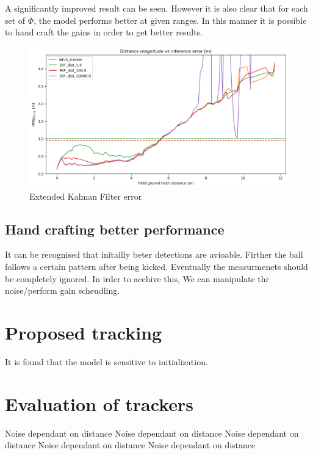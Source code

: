 \documentclass[a4paper,twoside,12pt]{report}
\begin{document}
A significantly improved result can be seen. However it is also clear that for each set of $\Phi$, the model performs better at given ranges. In this manner it is possible to hand craft the gains in order to get better results. 

\begin{figure}[h!]
\begin{center}
\includegraphics[width=13cm]{images/ekf_error.png}
\caption{Extended Kalman Filter error}
\label{fig:ekferror}
\end{center}
\end{figure}

\subsection{Hand crafting better performance}

It can be recognised that initailly beter detections are avioable. Firther the ball follows a certain pattern after being kicked. Eventually the measurmenets should be completely ignored. In irder to acehive this, We can manipulate thr noise/perform gain scheudling. 


\section{Proposed tracking}

It is found that the model is sensitive to initialization. 

\section{Evaluation of trackers}

Noise dependant on distance
Noise dependant on distance
Noise dependant on distance
Noise dependant on distance
Noise dependant on distance
\end{document}
